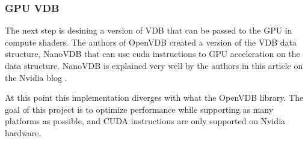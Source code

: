 \subsubsection{GPU VDB}

The next step is desining a version of VDB that can be passed to the GPU in compute shaders. The authors of OpenVDB created a version of the VDB data structure, NanoVDB\supercite{nanovdb:doc} that can use \acrshort{cuda} instructions to GPU acceleration on the data structure. NanoVDB is explained very well by the authors in this article on the Nvidia blog \cite{nanovdb:art}.

At this point this implementation diverges with what the OpenVDB library. The goal of this project is to optimize performance while supporting as many platforms as possible, and CUDA instructions are only supported on Nvidia hardware.

